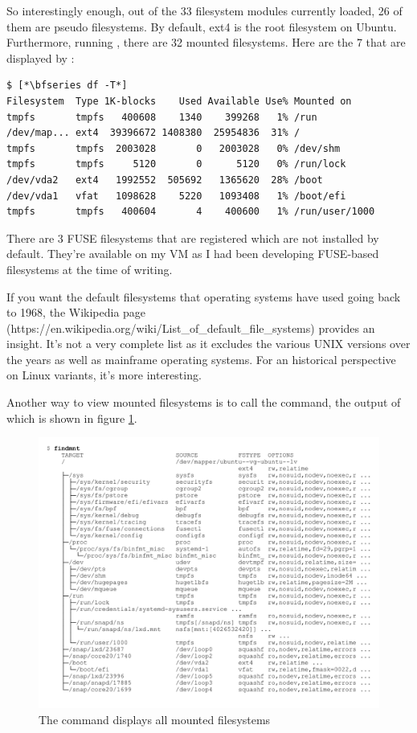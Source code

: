 \noindent
So interestingly enough, out of the 33 filesystem modules currently loaded, 26 of them are pseudo filesystems. By default, ext4 is the root filesystem on Ubuntu. Furthermore, running , there are 32 mounted filesystems. Here are the 7 that are displayed by :

\begin{lstlisting}
$ [*\bfseries df -T*]
Filesystem  Type 1K-blocks    Used Available Use% Mounted on
tmpfs       tmpfs   400608    1340    399268   1% /run
/dev/map... ext4  39396672 1408380  25954836  31% /
tmpfs       tmpfs  2003028       0   2003028   0% /dev/shm                            
tmpfs       tmpfs     5120       0      5120   0% /run/lock
/dev/vda2   ext4   1992552  505692   1365620  28% /boot
/dev/vda1   vfat   1098628    5220   1093408   1% /boot/efi
tmpfs       tmpfs   400604       4    400600   1% /run/user/1000
\end{lstlisting}

\noindent
There are 3 FUSE filesystems that are registered which are not installed by default. They're available on my VM as I had been developing FUSE-based filesystems at the time of writing.

If you want the default filesystems that operating systems have used going back to 1968, the Wikipedia page (https://en.wikipedia.org/wiki/List\_of\_default\_file\_systems) provides an insight. It's not a very complete list as it excludes the various UNIX versions over the years as well as mainframe operating systems. For an historical perspective on Linux variants, it's more interesting. 

\noindent 
Another way to view mounted filesystems is to call the  command, the output of which is shown in figure \ref{fig:findmnt}.

\begin{figure}
	\includegraphics[scale=0.6]{figures/findmnt.pdf}
	\centering
	\caption{The  command displays all mounted filesystems}
	\label{fig:findmnt}
\end{figure}

